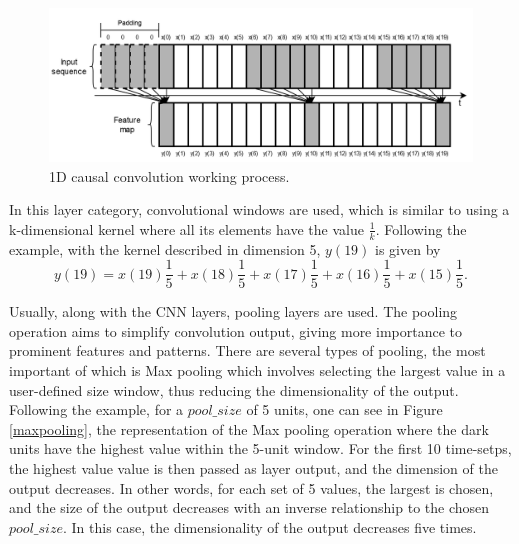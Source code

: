 \begin{figure}[h!]
    \centering
    \begin{center}
    \includegraphics[width=1\textwidth]{Images/conv2.png}
    \caption{1D causal convolution working process.}
    \label{conv2}
    \end{center}
\end{figure}

In this layer category, convolutional windows are used, which is similar to using a k-dimensional kernel where all its elements have the value $\frac{1}{k}$. Following the example, with the kernel described in dimension 5, $y(19)$ is given by
\begin{equation}
        y(19)=x(19)\frac{1}{5}+x(18)\frac{1}{5}+x(17)\frac{1}{5}+x(16)\frac{1}{5}+x(15)\frac{1}{5}.
    \label{19}
\end{equation}



Usually, along with the \ac{CNN} layers, pooling layers are used. The pooling operation aims to simplify convolution output, giving more importance to prominent features and patterns. There are several types of pooling, the most important of which is Max pooling which involves selecting the largest value in a user-defined size window, thus reducing the dimensionality of the output. Following the example, for a $pool\_size$ of 5 units, one can see in Figure \ref{maxpooling}, the representation of the Max pooling operation where the dark units have the highest value within the 5-unit window. For the first 10 time-setps, the highest value value is then passed as layer output, and the dimension of the output decreases. In other words, for each set of 5 values, the largest is chosen, and the size of the output decreases with an inverse relationship to the chosen $pool\_size$. In this case, the dimensionality of the output decreases five times.

